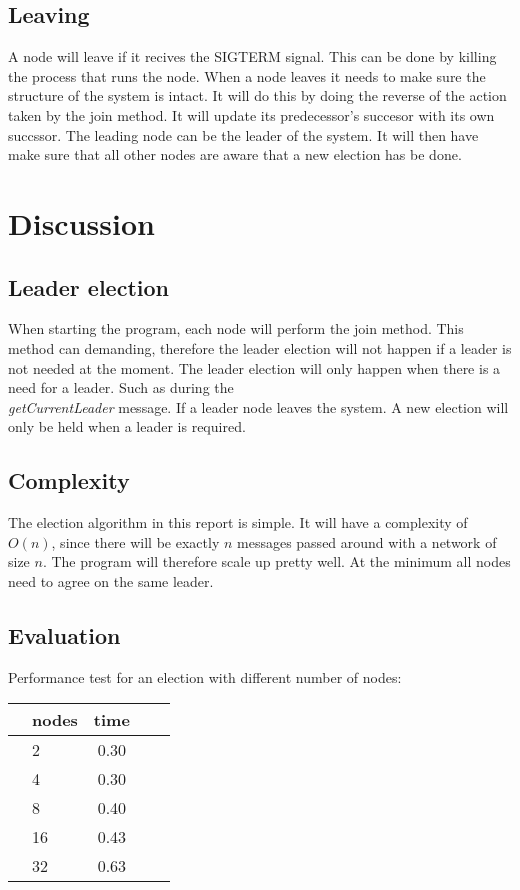 \subsection{Leaving}
A node will leave if it recives the SIGTERM signal. This can be done by killing the process that runs the node.
When a node leaves it needs to make sure the structure of the system is intact. It will do this by doing the reverse of the action taken by the
join method. It will update its predecessor's succesor with its own succssor. The leading node can be the leader of the system. It will then have make sure that all other nodes are aware that a new election has be done.

\section{Discussion}
\subsection{Leader election}
When starting the program, each node will perform the join method. This method can demanding, therefore the leader election will not happen if a leader is not needed at the moment. The leader election will only happen when there is a need for a leader. Such as during the \textit{\\getCurrentLeader} message. If a leader node leaves the system. A new election will only be held when a leader is required.

\subsection{Complexity}
The election algorithm in this report is simple. It will have a complexity of $O(n)$, since there will be exactly $n$ messages passed around with a network of size $n$. The program will therefore scale up pretty well. At the minimum all nodes need to agree on the same leader.

\newpage
\subsection{Evaluation}
Performance test for an election with different number of nodes:

\begin{table}[h]
\begin{center}
\begin{tabular}{clccc}
\toprule
&nodes     & time  \\\toprule
& 2      & 0.30     \\
& 4      & 0.30     \\
& 8      & 0.40      \\
& 16     & 0.43      \\
& 32     & 0.63      \\\bottomrule
\end{tabular}
\end{center}
\end{table}

